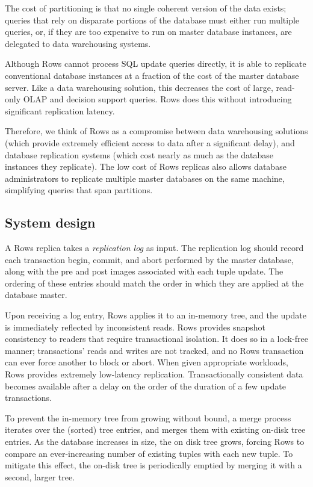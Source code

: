 \documentclass{sig-alternate-sigmod08}
\newcommand{\rows}{Rows\xspace}
\begin{document}
The cost of partitioning is that no single coherent version of the
data exists; queries that rely on disparate portions of the database
must either run multiple queries, or, if they are too expensive to run
on master database instances, are delegated to data warehousing
systems.

Although \rows cannot process SQL update queries directly, it is able
to replicate conventional database instances at a fraction of the cost
of the master database server.  Like a data warehousing solution, this
decreases the cost of large, read-only OLAP and decision support
queries.  \rows does this without introducing significant replication
latency.

Therefore, we think of \rows as a compromise between data warehousing
solutions (which provide extremely efficient access to data after a
significant delay), and database replication systems (which cost
nearly as much as the database instances they replicate).  The low cost
of \rows replicas also allows database administrators to replicate
multiple master databases on the same machine, simplifying queries
that span partitions.

\subsection{System design}

A \rows replica takes a {\em replication log} as input.  The
replication log should record each transaction begin, commit, and
abort performed by the master database, along with the pre and post
images associated with each tuple update.  The ordering of these
entries should match the order in which they are applied at the
database master.

Upon receiving a log entry, \rows applies it to an in-memory tree, and
the update is immediately reflected by inconsistent reads.  \rows
provides snapshot consistency to readers that require transactional
isolation.  It does so in a lock-free manner; transactions' reads and
writes are not tracked, and no \rows transaction can ever force
another to block or abort.  When given appropriate workloads, \rows
provides extremely low-latency replication.  Transactionally
consistent data becomes available after a delay on the order of the
duration of a few update transactions.

To prevent the in-memory tree from growing without bound, a merge
process iterates over the (sorted) tree entries, and merges them with
existing on-disk tree entries.  As the database increases in size, the
on disk tree grows, forcing \rows to compare an ever-increasing number
of existing tuples with each new tuple.  To mitigate this effect, the
on-disk tree is periodically emptied by merging it with a second,
larger tree.
\end{document}

